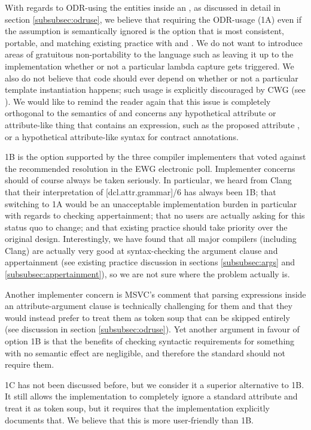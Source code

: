 With regards to ODR-using the entities inside an , as discussed in detail in section \ref{subsubsec:odruse}, we believe that requiring the ODR-usage (1A) even if the assumption is semantically ignored is the option that is most consistent, portable, and matching existing practice with  and . We do not want to introduce areas of gratuitous non-portability to the language such as leaving it up to the implementation whether or not a particular lambda capture gets triggered. We also do not believe that code should ever depend on whether or not a particular template instantiation happens; such usage is explicitly discouraged by CWG (see \cite{CWG2118}). We would like to remind the reader again that this issue is completely orthogonal to the semantics of  and concerns any hypothetical attribute or attribute-like thing that contains an expression, such as the proposed  attribute \cite{P1144R5}, or a hypothetical attribute-like syntax for contract annotations.
 
1B is the option supported by the three compiler implementers that voted against the recommended resolution in the EWG electronic poll. Implementer concerns should of course always be taken seriously. In particular, we heard from Clang that their interpretation of [dcl.attr.grammar]/6 has always been 1B; that switching to 1A would be an unacceptable implementation burden in particular with regards to checking  appertainment;  that no users are actually asking for this status quo to change; and that existing practice should take priority over the original design. Interestingly, we have found that all major compilers (including Clang) are actually very good at syntax-checking the argument clause and appertainment (see existing practice discussion in sections \ref{subsubsec:args} and \ref{subsubsec:appertainment}), so we are not sure where the problem actually is.

Another implementer concern is MSVC's comment that parsing expressions inside an attribute-argument clause is technically challenging for them and that they would instead prefer to treat them as token soup that can be skipped entirely (see discussion in section \ref{subsubsec:odruse}). Yet another argument in favour of option 1B is that the benefits of checking syntactic requirements for something with no semantic effect are negligible, and therefore the standard should not require them.

1C has not been discussed before, but we consider it a superior alternative to 1B. It still allows the implementation to completely ignore a standard attribute and treat it as token soup, but it requires that the implementation explicitly documents that. We believe that this is more user-friendly than 1B.

